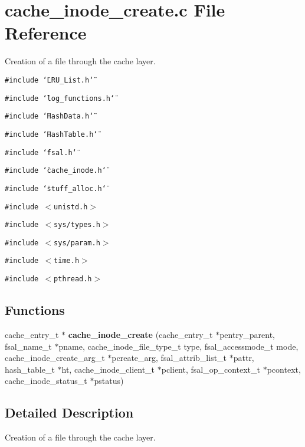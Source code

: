 \section{cache\_\-inode\_\-create.c File Reference}
\label{cache__inode__create_8c}
Creation of a file through the cache layer. 

{\tt \#include \char`\"{}LRU\_\-List.h\char`\"{}}\par
{\tt \#include \char`\"{}log\_\-functions.h\char`\"{}}\par
{\tt \#include \char`\"{}Hash\-Data.h\char`\"{}}\par
{\tt \#include \char`\"{}Hash\-Table.h\char`\"{}}\par
{\tt \#include \char`\"{}fsal.h\char`\"{}}\par
{\tt \#include \char`\"{}cache\_\-inode.h\char`\"{}}\par
{\tt \#include \char`\"{}stuff\_\-alloc.h\char`\"{}}\par
{\tt \#include $<$unistd.h$>$}\par
{\tt \#include $<$sys/types.h$>$}\par
{\tt \#include $<$sys/param.h$>$}\par
{\tt \#include $<$time.h$>$}\par
{\tt \#include $<$pthread.h$>$}\par
\subsection*{Functions}
\begin{CompactItemize}
\item 
cache\_\-entry\_\-t $\ast$ {\bf cache\_\-inode\_\-create} (cache\_\-entry\_\-t $\ast$pentry\_\-parent, fsal\_\-name\_\-t $\ast$pname, cache\_\-inode\_\-file\_\-type\_\-t type, fsal\_\-accessmode\_\-t mode, cache\_\-inode\_\-create\_\-arg\_\-t $\ast$pcreate\_\-arg, fsal\_\-attrib\_\-list\_\-t $\ast$pattr, hash\_\-table\_\-t $\ast$ht, cache\_\-inode\_\-client\_\-t $\ast$pclient, fsal\_\-op\_\-context\_\-t $\ast$pcontext, cache\_\-inode\_\-status\_\-t $\ast$pstatus)
\end{CompactItemize}


\subsection{Detailed Description}
Creation of a file through the cache layer. 


